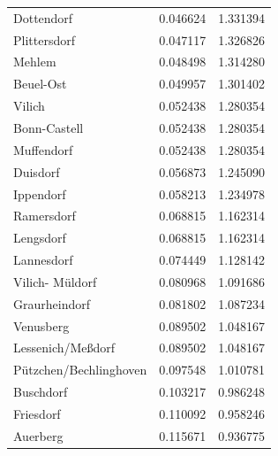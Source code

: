 \documentclass[UKenglish]{scrreprt}
\begin{document}
\begin{table}
\begin{tabular}{lrr}
		Dottendorf                          &                 0.046624 &              1.331394 \\
		Plittersdorf                        &                 0.047117 &              1.326826 \\
		Mehlem                              &                 0.048498 &              1.314280 \\
		Beuel-Ost                           &                 0.049957 &              1.301402 \\
		Vilich                              &                 0.052438 &              1.280354 \\
		Bonn-Castell                        &                 0.052438 &              1.280354 \\
		Muffendorf                          &                 0.052438 &              1.280354 \\
		Duisdorf                            &                 0.056873 &              1.245090 \\
		Ippendorf                           &                 0.058213 &              1.234978 \\
		Ramersdorf                          &                 0.068815 &              1.162314 \\
		Lengsdorf                           &                 0.068815 &              1.162314 \\
		Lannesdorf                          &                 0.074449 &              1.128142 \\
		Vilich- Müldorf                     &                 0.080968 &              1.091686 \\
		Graurheindorf                       &                 0.081802 &              1.087234 \\
		Venusberg                           &                 0.089502 &              1.048167 \\
		Lessenich/Meßdorf                   &                 0.089502 &              1.048167 \\
		Pützchen/Bechlinghoven              &                 0.097548 &              1.010781 \\
		Buschdorf                           &                 0.103217 &              0.986248 \\
		Friesdorf                           &                 0.110092 &              0.958246 \\
		Auerberg                            &                 0.115671 &              0.936775 \\

\end{tabular}
\end{table}
\end{document}
